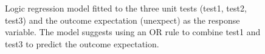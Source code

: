 \documentclass[
]{jds}
\begin{document}
\label{cell-fig-logic-reg}
\begin{figure}[H]


\caption{\label{fig-logic-reg}Logic regression model fitted to the three
unit tests (test1, test2, test3) and the outcome expectation (unexpect)
as the response variable. The model suggests using an OR rule to combine
test1 and test3 to predict the outcome expectation.}

\end{figure}%
\end{document}
